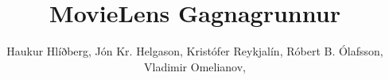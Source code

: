 
\renewcommand{\d}[1]{\;\textsf{d}#1}
\newcommand{\pd}[1]{\partial #1}
\newcommand{\D}{\;\textsf{D}}
\providecommand{\e}[1]{\ensuremath{\times 10^{#1}}}
\newcommand{\kg}[1]{\SI{#1}{\kilo\gram}}
\newcommand{\mA}[1]{\SI{#1}{\milli\ampere}}
\newcommand{\amp}[1]{SI{#1}{\ampere\xspace}}


\newcommand{\realset}{\ensuremath{\mathbb{R}}}
\newcommand{\intset}{\ensuremath{\mathbb{Z}}}
\newcommand{\ratset}{\ensuremath{\mathbb{Q}}}


\newcommand{\adfr}{\ensuremath{\text{FR}}}
\newcommand{\addp}{\ensuremath{\text{DP}}}
\newcommand{\adpv}{\ensuremath{\text{PV}}}

\newcommand{\cfigure}[2]{\begin{figure}[h]
\centering %
\texttt{[image: \#1]}%
\caption{#2\label{fig:#1}}%
\end{figure}%
}
\newcommand{\cfiguresize}[3]{\begin{figure}[h]
\centering %
\texttt{[image: \#1]}%
\caption{#2\label{fig:#1}}%
\end{figure}%
}



\author{Haukur Hlíðberg, Jón Kr. Helgason, Kristófer Reykjalín, Róbert B. Ólafsson, Vladimir Omelianov,}  %
\title{MovieLens Gagnagrunnur}  %
\graphicspath{{graphics/}{Graphics/}{./}}

\usepackage[backend=biber, bibencoding=utf8, style=ieee]{biblatex}


\usepackage{caption}
\captionsetup[figure]{name=Mynd}

\renewcommand*{\lstlistingname}{Query}

\usepackage[final,hidelinks]{hyperref} %
